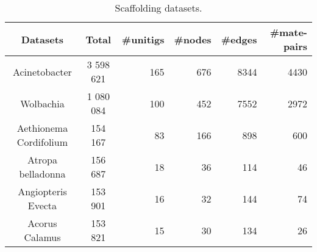 
      \begin{table}
\footnotesize
          \centering
              \begin{tabular}{|c|c|r|r|r|r|} 
              \hline
          Datasets & Total & \#unitigs  & \#nodes & \#edges   & \#mate-pairs \\ 
               \hline
              \hline
              Acinetobacter
              & 3 598 621 & 165 & 676 & 8344 & 4430 \\ 
              \hline
              \hline
              Wolbachia 
              & 1 080 084 & 100 & 452 & 7552 & 2972 \\ 
              \hline
              \hline
              Aethionema 
              Cordifolium
              & 154 167 & 83 & 166 & 898 & 600 \\ 
              \hline     
              \hline
              Atropa belladonna
              & 156 687 & 18 & 36 & 114 & 46 \\ 
              \hline
              \hline
              Angiopteris Evecta
              & 153 901  & 16 & 32 & 144 & 74 \\ 
              \hline
              \hline
              Acorus Calamus
              & 153 821  & 15 & 30 & 134 & 26 \\ 
               \hline                       
              \end{tabular}
             \caption{Scaffolding datasets. }
              \label{tab:data}
            \end{table}
            
            